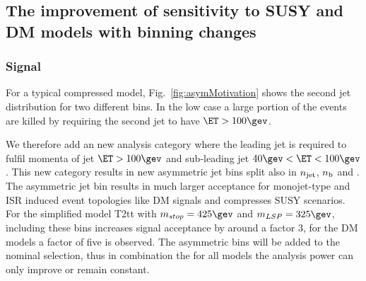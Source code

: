 


\subsection{The improvement of sensitivity to SUSY and DM models with binning changes}

\subsubsection{Signal }\label{sec:asym_bin}

For a typical compressed model, Fig.~\ref{fig:asymMotivation} shows the second jet \PT
distribution for two different \HT bins. In the low \HT case a large portion of
the events are killed by requiring the second jet to have $\ET>100\gev$. 

We therefore add an new analysis category where the leading jet is required to fulfil 
momenta of jet $\ET>100\gev$ and sub-leading jet $40\gev<\ET<100\gev$. This new category 
results in new asymmetric jet bins split also in $n_{\text{jet}}$, $n_{\text{b}}$ and \HT. The asymmetric jet bin
results in much larger acceptance for monojet-type and ISR induced event topologies like DM signals
and compresses SUSY scenarios. 
For the simplified model T2tt with $m_{stop}=425\gev$ and $m_{LSP}=325\gev$, 
including these bins increases signal acceptance by around a factor 3, for the DM models a factor of five is observed.
The asymmetric bins will be added to the nominal selection, thus in combination the for all models the analysis power can only improve or remain constant.
